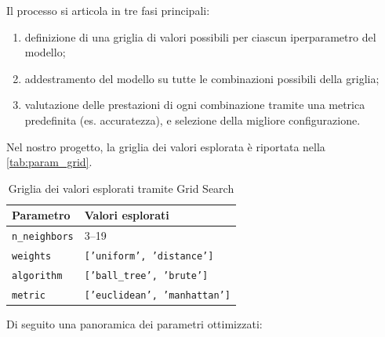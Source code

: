 \documentclass{article}
\begin{document}
Il processo si articola in tre fasi principali:
\begin{enumerate}
    \item definizione di una griglia di valori possibili per ciascun iperparametro del modello;
    \item addestramento del modello su tutte le combinazioni possibili della griglia;
    \item valutazione delle prestazioni di ogni combinazione tramite una metrica predefinita (es. accuratezza), e selezione della migliore configurazione.
\end{enumerate}

Nel nostro progetto, la griglia dei valori esplorata è riportata nella \autoref{tab:param_grid}.

\begin{table}[ht!]
\centering
\begin{tabular}{ll}
\toprule
\textbf{Parametro} & \textbf{Valori esplorati} \\
\midrule
\texttt{n\_neighbors} & 3--19 \\
\texttt{weights} & \texttt{['uniform', 'distance']} \\
\texttt{algorithm} & \texttt{['ball\_tree', 'brute']} \\
\texttt{metric} & \texttt{['euclidean', 'manhattan']} \\
\bottomrule
\end{tabular}
\caption{Griglia dei valori esplorati tramite Grid Search}
\label{tab:param_grid}
\end{table}

Di seguito una panoramica dei parametri ottimizzati:
\end{document}
